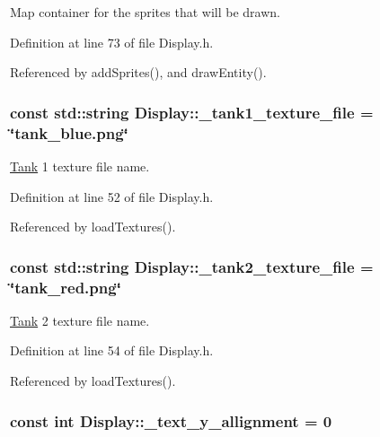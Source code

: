 Map container for the sprites that will be drawn. 



Definition at line 73 of file Display.\-h.



Referenced by add\-Sprites(), and draw\-Entity().

\hypertarget{classDisplay_a4055ddd33815347b986bb7437bdc1c79}{
\subsubsection[{\-\_\-tank1\-\_\-texture\-\_\-file}]{\setlength{\rightskip}{0pt plus 5cm}const std\-::string Display\-::\-\_\-tank1\-\_\-texture\-\_\-file = \char`\"{}tank\-\_\-blue.\-png\char`\"{}\hspace{0.3cm}{\ttfamily [private]}}}\label{classDisplay_a4055ddd33815347b986bb7437bdc1c79}


\hyperlink{classTank}{Tank} 1 texture file name. 



Definition at line 52 of file Display.\-h.



Referenced by load\-Textures().

\hypertarget{classDisplay_a5ab9e2102af414ee9d1d8d5b090ad9da}{
\subsubsection[{\-\_\-tank2\-\_\-texture\-\_\-file}]{\setlength{\rightskip}{0pt plus 5cm}const std\-::string Display\-::\-\_\-tank2\-\_\-texture\-\_\-file = \char`\"{}tank\-\_\-red.\-png\char`\"{}\hspace{0.3cm}{\ttfamily [private]}}}\label{classDisplay_a5ab9e2102af414ee9d1d8d5b090ad9da}


\hyperlink{classTank}{Tank} 2 texture file name. 



Definition at line 54 of file Display.\-h.



Referenced by load\-Textures().

\hypertarget{classDisplay_ae85ee765b92689445aca8cead24d8184}{
\subsubsection[{\-\_\-text\-\_\-y\-\_\-allignment}]{\setlength{\rightskip}{0pt plus 5cm}const int Display\-::\-\_\-text\-\_\-y\-\_\-allignment = 0\hspace{0.3cm}{\ttfamily [private]}}}\label{classDisplay_ae85ee765b92689445aca8cead24d8184}


